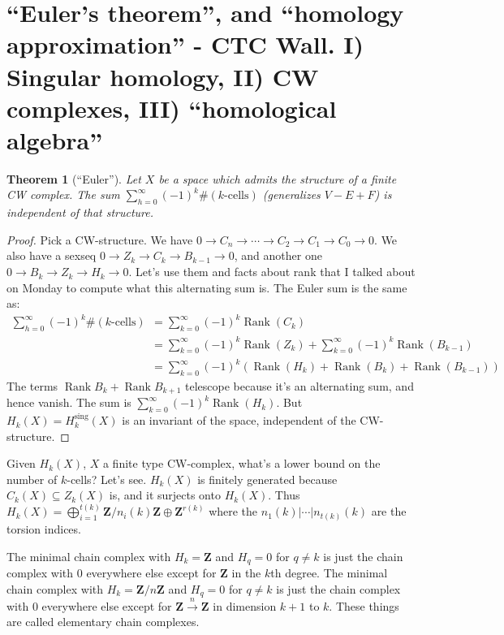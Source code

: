 \documentclass{amsart}
\theoremstyle{theorem}
\newtheorem{theorem}{Theorem}[section]
\theoremstyle{definition}
\DeclareMathOperator{\rank}{Rank}
\newcommand{\Z}{\mathbf Z}
\begin{document}
\section{``Euler's theorem'', and ``homology approximation'' - CTC Wall. I) Singular homology, II) CW complexes, III) ``homological algebra''}
\begin{theorem}[``Euler'']
Let $X$ be a space which admits the structure of a finite CW complex. The sum $\sum_{h=0}^\infty (-1)^k\#(k\text{-cells})$ (generalizes $V-E+F$) is independent of that structure.
\end{theorem}
\begin{proof}
Pick a CW-structure. We have $0\to C_n\to\cdots\to C_2\to C_1\to C_0\to 0$. We also have a sexseq $0\to Z_k\to C_k\to B_{k-1}\to 0$, and another one $0\to B_k\to Z_k\to H_k\to 0$. Let's use them and facts about rank that I talked about on Monday to compute what this alternating sum is. The Euler sum is the same as:
\begin{align*}
\sum_{h=0}^\infty (-1)^k\#(k\text{-cells}) & = \sum^\infty_{k=0}(-1)^k\rank(C_k)\\
& = \sum^\infty_{k=0}(-1)^k\rank(Z_k)+\sum^\infty_{k=0}(-1)^k\rank(B_{k-1})\\
& = \sum^\infty_{k=0}(-1)^k(\rank( H_k)+\rank(B_k)+\rank(B_{k-1}))
\end{align*}
The terms $\rank B_k+\rank B_{k+1}$ telescope because it's an alternating sum, and hence vanish. The sum is $\sum^\infty_{k=0}(-1)^k\rank( H_k)$. But $ H_k(X)= H_k^\text{sing}(X)$ is an invariant of the space, independent of the CW-structure.
\end{proof}
Given $ H_k(X)$, $X$ a finite type CW-complex, what's a lower bound on the number of $k$-cells? Let's see. $ H_k(X)$ is finitely generated because $C_k(X)\subseteq Z_k(X)$ is, and it surjects onto $ H_k(X)$. Thus $ H_k(X)=\bigoplus^{t(k)}_{i=1}\Z/n_i(k)\Z\oplus \Z^{r(k)}$ where the $n_1(k)|\cdots|n_{t(k)}(k)$ are the torsion indices.

The minimal chain complex with $ H_k=\Z$ and $ H_q=0$ for $q\neq k$ is just the chain complex with $0$ everywhere else except for $\Z$ in the $k$th degree. The minimal chain complex with $ H_k=\Z/n\Z$ and $ H_q=0$ for $q\neq k$ is just the chain complex with $0$ everywhere else except for $\Z\xrightarrow{n}\Z$ in dimension $k+1$ to $k$. These things are called elementary chain complexes.
\end{document}
